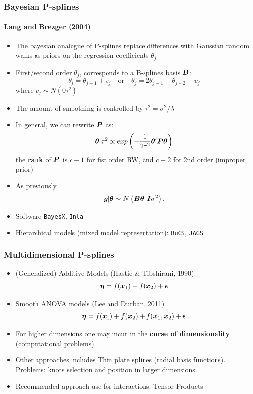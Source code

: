 \documentclass[11pt]{beamer}
\newcommand{\nologo}{\setbeamertemplate{logo}{}}
\newcommand{\bfx}{\mbox{\boldmath $x$}}
\newcommand{\bfy}{\mbox{\boldmath $y$}}
\newcommand{\bfB}{\mbox{\boldmath $B$}}
\newcommand{\bfI}{\mbox{\boldmath $I$}}
\newcommand{\bfP}{\mbox{\boldmath $P$}}
\newcommand{\bfeta}{\mbox{\boldmath $\eta$}}
\newcommand{\bfepsilon}{\mbox{\boldmath$\epsilon$}}
\newcommand{\bftheta}{\mbox{\boldmath $\theta$}}
\begin{document}
{\nologo
\begin{frame}
 \frametitle{Bayesian P-splines}
 	\framesubtitle{Lang and Brezger (2004)}
\footnotesize

\begin{itemize}
 	\item The bayesian analogue of P-splines replace differences with Gaussian random walks as priors on the regression coefficients $\theta_j$
  \item First/second order 
 $\theta_j$, corresponds to a B-splines basis $\bfB$:
 \[\theta_j= \theta_{j-1}+v_j \quad \text{or}\quad \theta_j= 2\theta_{j-1}-\theta_{j-2}+v_j
  \]
  where  $v_j\sim N(0\tau^2)$
  \item The amount of smoothing is controlled by $\tau^2=\sigma^2/\lambda$
  \item In general, we can rewrite $\bfP$ as:
  \[
  \bftheta |\tau^2 \propto exp \left (-\frac{1}{2\tau^2} \bftheta^\prime \bfP
   \bftheta \right )
  \]
  the {\bf rank} of $\bfP$ is $c-1$ for fist order RW, and $c-2$ for 2nd order (improper prior)
\item As previously
$$
\bfy |\bftheta \sim N\left (\bfB \bftheta ,\bfI \sigma^2 \right ),
$$
\item Software \texttt{BayesX}, \texttt{Inla}
\item Hierarchical models (mixed model representation):  \texttt{BuGS}, \texttt{JAGS}
\end{itemize}

\end{frame}
}


\begin{frame}[fragile]
\frametitle{Multidimensional P-splines}
 \footnotesize
 \begin{itemize}
   \item (Generalized) Additive Models (Hastie \& Tibshirani, 1990)
   $$
      \bfeta=f(\bfx_1)+f(\bfx_2)+ \bfepsilon
   $$
   \vspace{-.2in}
   \item Smooth ANOVA models (Lee and Durban, 2011)
   $$
      \bfeta=f(\bfx_1)+f(\bfx_2)+f(\bfx_1,\bfx_2)  + \bfepsilon
   $$
   \vspace{-.2in}
   \item For higher dimensions one may incur in the {\bf curse of dimensionality} (computational problems)
   
   \item Other approaches includes Thin plate splines (radial basis functions). Problems: knots selection and position in larger dimensions.
   
   \item Recommended approach use for interactions: \alert{Tensor Products}
 \end{itemize}
 
 \vfill
 
 \vfill
 
\end{frame}
\end{document}
